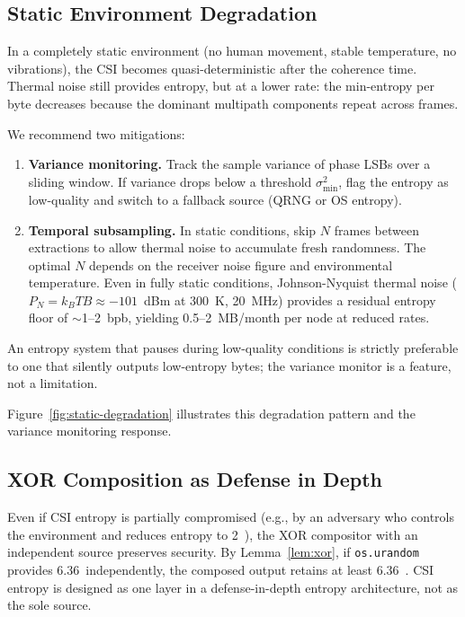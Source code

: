 \documentclass[sigconf,anonymous,review]{acmart}
\newcommand{\bpb}{\text{bits/byte}}
\begin{document}
\subsection{Static Environment Degradation}
\label{subsec:static}

In a completely static environment (no human movement, stable temperature, no vibrations), the CSI becomes quasi-deterministic after the coherence time.
Thermal noise still provides entropy, but at a lower rate: the min-entropy per byte decreases because the dominant multipath components repeat across frames.

We recommend two mitigations:
\begin{enumerate}
\item \textbf{Variance monitoring.} Track the sample variance of phase LSBs over a sliding window. If variance drops below a threshold $\sigma_{\min}^2$, flag the entropy as low-quality and switch to a fallback source (QRNG or OS entropy).
\item \textbf{Temporal subsampling.} In static conditions, skip $N$ frames between extractions to allow thermal noise to accumulate fresh randomness. The optimal $N$ depends on the receiver noise figure and environmental temperature.
Even in fully static conditions, Johnson-Nyquist thermal noise ($P_N = k_B T B \approx -101$~dBm at 300~K, 20~MHz) provides a residual entropy floor of $\sim$1--2~bpb, yielding 0.5--2~MB/month per node at reduced rates.
\end{enumerate}

An entropy system that pauses during low-quality conditions is strictly preferable to one that silently outputs low-entropy bytes; the variance monitor is a feature, not a limitation.

Figure~\ref{fig:static-degradation} illustrates this degradation pattern and the variance monitoring response.



\subsection{XOR Composition as Defense in Depth}
\label{subsec:xor-defense}

Even if CSI entropy is partially compromised (e.g., by an adversary who controls the environment and reduces entropy to 2~\bpb), the XOR compositor with an independent source preserves security.
By Lemma~\ref{lem:xor}, if \texttt{os.urandom} provides 6.36~\bpb independently, the composed output retains at least 6.36~\bpb.
CSI entropy is designed as one layer in a defense-in-depth entropy architecture, not as the sole source.
\end{document}
